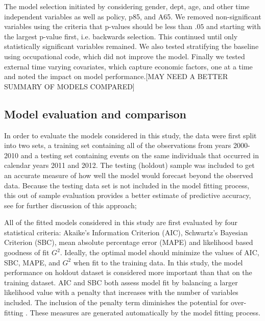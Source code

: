 \documentclass[12pt,letterpaper]{article}
\begin{document}
The model selection initiated by considering gender, dept, age, and other time independent variables as well as policy, p85, and A65.  We removed non-significant variables using the criteria that p-values should be less than $.05$ and starting with the largest p-value first, i.e. backwards selection.  This continued until only statistically significant variables remained.  We also tested stratifying the baseline using occupational code, which did not improve the model. Finally we tested external time varying covariates, which capture economic factors, one at a time and noted the impact on model performance.[MAY NEED A BETTER SUMMARY OF MODELS COMPARED]


\subsection{Model evaluation and comparison}

In order to evaluate the models considered in this study, the data were first split into two sets, a training set containing all of the observations from years 2000-2010 and a testing set containing events on the same individuals that occurred in calendar years 2011 and 2012. The testing (holdout) sample was included to get an accurate measure of how well the model would forecast beyond the observed data.  Because the testing data set is not included in the model fitting process, this out of sample evaluation provides a better estimate of predictive accuracy, see \citet{kuhn2013} for further discussion of this approach;

All of the fitted models considered in this study are first evaluated by four statistical criteria:  Akaike’s Information Criterion (AIC), Schwartz’s Bayesian Criterion (SBC), mean absolute percentage error (MAPE) and likelihood based goodness of fit $G^2$. Ideally, the optimal model should minimize the values of AIC, SBC, MAPE, and $G^2$ when fit to the training data. In this study, the model performance on holdout dataset is considered more important than that on the training dataset.
AIC and SBC both assess model fit by balancing a larger likelihood value with a penalty that increases with the number of variables included.  The inclusion of the penalty term diminishes the potential for over-fitting \citep{allison2010,hosmer2013}. These measures are generated automatically by the model fitting process.
\end{document}
